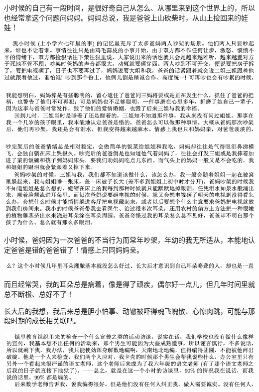 \documentclass[9pt, b5paper]{article}
\begin{document}
小时候的自己有一段时间，是很好奇自己从怎么、从哪里来到这个世界上的，所以也经常拿这个问题问妈妈。妈妈总说，我是爸爸上山砍柴时，从山上捡回来的娃娃！

\begin{center}
\includegraphics[width=.9\linewidth]{./pic/backups_plans_20210422_102924.png}
\end{center}

\begin{center}
\includegraphics[width=.9\linewidth]{./pic/backups_plans_20210422_103112.png}
\end{center}

\begin{center}
\includegraphics[width=.9\linewidth]{./pic/backups_plans_20210422_103008.png}
\end{center}

小时候，爸妈因为一次爸爸的不当行为而常年吵架，年幼的我无所适从，本能地认定爸爸是错的爸爸错了！情感上只同妈妈亲。

\begin{center}
\includegraphics[width=.9\linewidth]{./pic/backups_plans_20210422_114555.png}
\end{center}

而且经常哭，我的耳朵总是病着，像是得了顽疾，偶尔好一点儿，但几年时间里就总不断根、总好不了！

长大后的我想，我后来总是胆小怕事、动辙被吓得魂飞魄散、心惊肉跳，可能与那段时期的成长相关联吧。

\begin{center}
\includegraphics[width=.9\linewidth]{./pic/backups_plans_20210422_101017.png}
\end{center}
\end{document}
